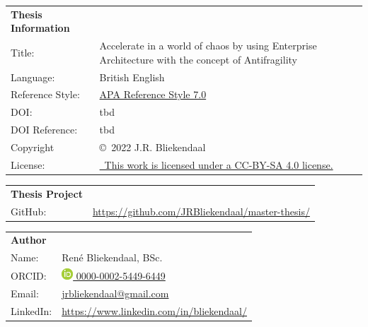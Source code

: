 
\begin{minipage}{1\textwidth}
	\begin{tabular}{p{}p{}}
		\textbf{Thesis Information} & \\
		Title: & Accelerate in a world of chaos by using Enterprise Architecture with the concept of Antifragility \\
		Language: & British English \\
		Reference Style: & \href{https://apastyle.apa.org/products/publication-manual-7th-edition}{APA Reference Style 7.0}\\
		DOI: & tbd \\
		DOI Reference: & tbd \\
		Copyright & \copyright\ 2022 J.R. Bliekendaal\\
		License: & \href{https://creativecommons.org/licenses/by-sa/4.0/}{\ccbysa\ This work is licensed under a CC-BY-SA 4.0 license.}\\
	\end{tabular}
\end{minipage}

\begin{minipage}{1\textwidth}
	\begin{tabular}{p{}p{}}
		\textbf{Thesis Project} & \\
		GitHub: & \url{https://github.com/JRBliekendaal/master-thesis/}\\
	\end{tabular}
\end{minipage}

\begin{minipage}{1\textwidth}
	\begin{tabular}{p{}p{}}
		\textbf{Author} & \\
		Name: & René Bliekendaal, BSc. \\
		ORCID: & \href{https://orcid.org/0000-0002-5449-6449/}{\includegraphics[scale=0.45]{images/ORCIDiD_icon} 0000-0002-5449-6449}\\
		Email: & \href{mailto:jrbliekendaal@gmail.com}{jrbliekendaal@gmail.com}\\
		LinkedIn: & \url{https://www.linkedin.com/in/bliekendaal/}\\
	\end{tabular}
\end{minipage}

